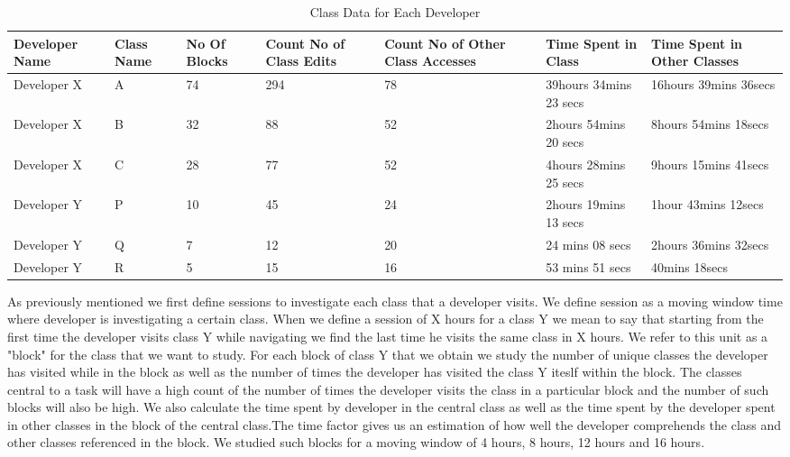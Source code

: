 \begin{center}
\begin{table*}[t]
	\centering
	\caption{Class Data for Each Developer}
	\begin{tabular}{|l|l|l|l|l|l|l|}
	\hline

Developer Name & Class Name & No Of Blocks &Count No of Class Edits & Count No of Other Class Accesses & Time Spent in Class & Time Spent in Other Classes\\
\hline\hline
Developer X & A & 74 & 294 & 78 & 39hours 34mins 23 secs & 16hours 39mins 36secs\\
\hline
Developer X & B & 32 & 88 & 52 & 2hours 54mins 20 secs & 8hours 54mins 18secs\\
\hline
Developer X & C & 28 & 77 & 52 & 4hours 28mins 25 secs & 9hours 15mins 41secs\\
\hline
Developer Y & P & 10 & 45 & 24 & 2hours 19mins 13 secs & 1hour 43mins 12secs\\
\hline
Developer Y & Q & 7 & 12 & 20 & 24 mins 08 secs & 2hours 36mins 32secs\\
\hline
Developer Y & R & 5 & 15 & 16 & 53 mins 51 secs & 40mins 18secs\\
\hline

	\end{tabular}
	\label{fig:AnalysisData}
\end{table*}
\end{center}

As previously mentioned we first define sessions to investigate each class that a developer visits. We define session as a moving window time where developer is investigating a certain class. When we define a session of X hours for a class Y we mean to say that starting from the first time the developer visits class Y while navigating we find the last time he visits the same class in X hours. We refer to this unit as a  "block" for the class that we want to study. For each block of class Y that we obtain we study the number of unique classes the developer has visited while in the block as well as the number of times the developer has visited the class Y iteslf within the block. The classes central to a task will have a high count of the number of times the developer visits the class in a particular block and the number of such blocks will also be high. We also calculate the time spent by developer in the central class as well as the time spent by the developer spent in other classes in the block of the central class.The time factor gives us an estimation of how well the developer comprehends the class and other classes referenced in the block. We studied such blocks for a moving window of 4 hours, 8 hours, 12 hours and 16 hours. 

